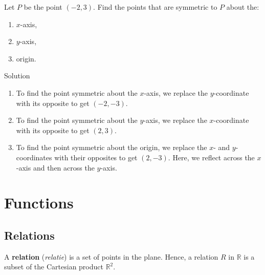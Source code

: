 \ifvc\pagebreak\fi
\begin{example}
Let $P$ be the point $(-2,3)$.  Find the points that are symmetric to $P$ about the:

\begin{multicols}{3}

\begin{enumerate}

\item  $x$-axis,

\item  $y$-axis,

\item  origin.

\end{enumerate}

\end{multicols}

Solution 


\begin{enumerate}

\item  To find the point symmetric about the $x$-axis, we replace the $y$-coordinate with its opposite to get  $(-2,-3)$. 

\item  To find the point symmetric about the $y$-axis, we replace the $x$-coordinate with its opposite to get $(2,3)$. 

\item  To find the point symmetric about the origin, we replace the $x$- and $y$-coordinates with their opposites to get $(2,-3)$. Here, we reflect across the $x$-axis and then across the $y$-axis. 

\end{enumerate}
\end{example}


\fi


\section{Functions}
\subsection{Relations}
\label{relaties}
\begin{definition}[Relation]
A  \textbf{relation} (\textit{relatie}) is a set of points in the plane. Hence,  a relation $R$ in $\mathbb{R}$ is a subset of the Cartesian product $\mathbb{R}^2$. 
\end{definition}


